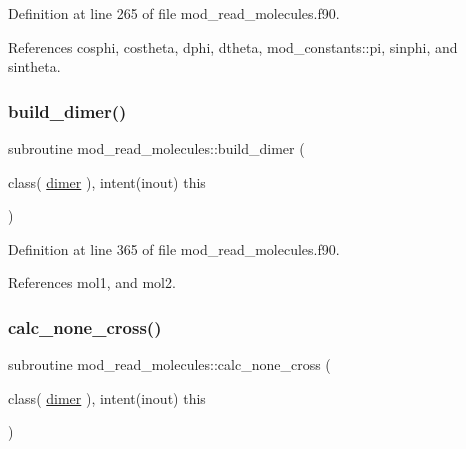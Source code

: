 Definition at line 265 of file mod\+\_\+read\+\_\+molecules.\+f90.



References cosphi, costheta, dphi, dtheta, mod\+\_\+constants\+::pi, sinphi, and sintheta.

\mbox{\label{namespacemod__read__molecules_a2766cc4e8b825aea9e9695ee50fbd2f9}} 
\subsubsection{\texorpdfstring{build\+\_\+dimer()}{build\_dimer()}}
{\footnotesize\ttfamily subroutine mod\+\_\+read\+\_\+molecules\+::build\+\_\+dimer (\begin{DoxyParamCaption}\item[{class( \hyperlink{structmod__read__molecules_1_1dimer}{dimer} ), intent(inout)}]{this }\end{DoxyParamCaption})}



Definition at line 365 of file mod\+\_\+read\+\_\+molecules.\+f90.



References mol1, and mol2.

\mbox{\label{namespacemod__read__molecules_a5e6a958bafd00dfe5c9279092970ae47}} 
\subsubsection{\texorpdfstring{calc\+\_\+none\+\_\+cross()}{calc\_none\_cross()}}
{\footnotesize\ttfamily subroutine mod\+\_\+read\+\_\+molecules\+::calc\+\_\+none\+\_\+cross (\begin{DoxyParamCaption}\item[{class( \hyperlink{structmod__read__molecules_1_1dimer}{dimer} ), intent(inout)}]{this }\end{DoxyParamCaption})}



